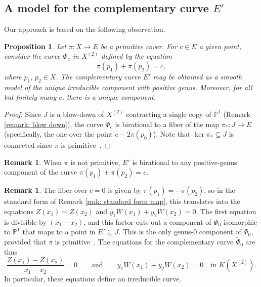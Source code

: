 \documentclass[a4paper,twoside,english]{amsart}
\theoremstyle{plain}
\newtheorem{proposition}[theorem]{Proposition}
\theoremstyle{definition}
\newtheorem{remark}[theorem]{Remark}
\begin{document}
\subsection{A model for the complementary curve \texorpdfstring{$E'$}{E'}}
Our approach is based on the following observation.
\begin{proposition}
    Let $\pi :X \to E$ be a primitive cover.
    For $c\in E$ a given point, consider the curve $\Phi_c$ in $X^{(2)}$ defined by the equation \[\pi(p_1)+\pi(p_2)=c, \] where $p_1, \, p_2\in X$. %
    The complementary curve $E'$ may be obtained as a smooth model of the unique irreducible component with positive genus. Moreover, for all but finitely many $c$, there is a unique component.
\end{proposition}
\begin{proof}
    Since $J$ is a blow-down of $X^{(2)}$ contracting a single copy of $\mathbb{P}^1$ (Remark \ref{remark: blow down}), the curve $\Phi_c$ is birational to a fiber of the map $\pi_* : J \to E$ (specifically, the one over the point $c-2\pi(p_0)$). Note that $\ker \pi_\ast \subseteq J$ is connected since $\pi$ is primitive~\cite[p.~154]{freyCurvesGenus21991}.
\end{proof}
\begin{remark}
    When $\pi$ is not primitive, $E'$ is birational to any positive-genus component of the curve $\pi(p_1)+\pi(p_2)=c$.
\end{remark}

\begin{remark}
\label{remark: trace computations}
The fiber over $c = 0$ is given by $\pi(p_1) = -\pi(p_2)$, so in the standard form of Remark \ref{rmk: standard form map}, this translates into the equations
$Z(x_1) = Z(x_2)$ and $y_1 W(x_1) + y_2 W(x_2) = 0.$
The first equation is divisible by $(x_1 - x_2)$, and this factor cuts out a component of $\Phi_0$ isomorphic to $\mathbb{P}^1$ that maps to a point in $E' \subseteq J$. This is the only genus-$0$ component of $\Phi_0$, provided that $\pi$ is primitive~\cite[\S 3]{gallese}. The equations for the complementary curve $\tilde{\Phi}_0$ are thus
\begin{equation}
    \label{eq: equations in the zero fiber}
    \frac{Z(x_1) - Z(x_2)}{x_1 - x_2} = 0 \qquad \text{and} \qquad y_1 W(x_1) + y_2 W(x_2) = 0 \quad \text{in}\,\, K(X^{(2)}).
\end{equation}
In particular, these equations define an irreducible curve.
\end{remark}
\end{document}
